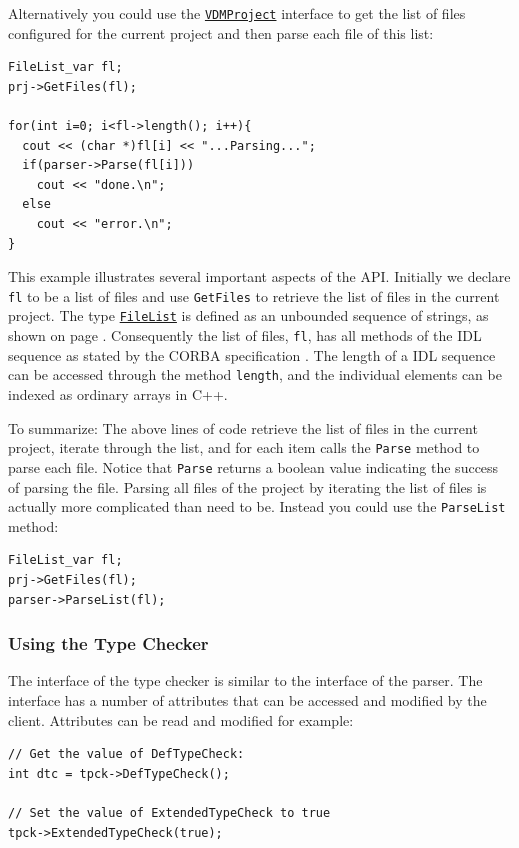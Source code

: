 \documentclass[\pformat,12pt]{article}
\newcommand{\FileList}{\hyperlink{type.FileList}{FileList}}
\newcommand{\VDMProject}{\hyperlink{interface.VDMProject}{VDMProject}}
\begin{document}
Alternatively you could use the {\tt \VDMProject} interface to get the
list of files configured for the current project and then parse each
file of this list:

\begin{verbatim}
FileList_var fl;
prj->GetFiles(fl);

for(int i=0; i<fl->length(); i++){
  cout << (char *)fl[i] << "...Parsing...";
  if(parser->Parse(fl[i]))
    cout << "done.\n";
  else
    cout << "error.\n";
}
\end{verbatim}

This example illustrates several important aspects of the API.
Initially we declare {\tt fl} to be a list of files and use {\tt GetFiles}
to retrieve the list of files in the current project. 
The type {\tt \FileList} is defined
as an unbounded sequence of strings, as shown on page
\pageref{ref:corbatypes}. Consequently the list of files,
{\tt fl}, has all methods of the IDL sequence as stated by the CORBA
specification \cite{OMG&96}. The length of a IDL sequence can be accessed
through the method {\tt length}, and the individual elements can be indexed
as ordinary arrays in C++.  

To summarize: The above lines of code
retrieve the list of files in the current project, iterate through the
list, and for each item calls the {\tt Parse} method to parse each file.
Notice that {\tt Parse} returns a boolean value indicating the success of
parsing the file.  Parsing all files of the project by iterating the
list of files is actually more complicated than need to be. Instead
you could use the {\tt ParseList} method:

\begin{verbatim}
FileList_var fl;
prj->GetFiles(fl);
parser->ParseList(fl);
\end{verbatim}

\subsubsection{Using the Type Checker}
\label{usingthetypechecker}

The interface of the type checker is similar to the interface
of the parser. The interface has a number of attributes that can be
accessed and modified by the client. Attributes can be read and
modified for example: 

\begin{verbatim}
// Get the value of DefTypeCheck:
int dtc = tpck->DefTypeCheck();

// Set the value of ExtendedTypeCheck to true
tpck->ExtendedTypeCheck(true);
\end{verbatim}
\end{document}
